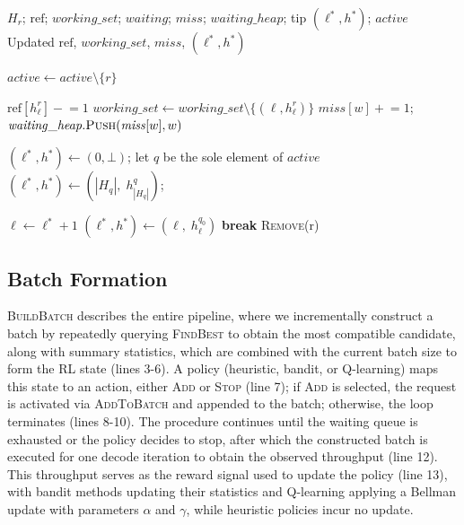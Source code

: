 \begin{algorithm}[t]
\caption{\textsc{Finish}(r)}
\label{alg:finish}
\begin{algorithmic}[1]
\Require $H_r$; $\mathrm{ref}$; $\mathit{working\_set}$; $\mathit{waiting}$; $\mathit{miss}$; $\mathit{waiting\_heap}$; tip $(\ell^*, h^*)$; $\mathit{active}$
\Ensure Updated $\mathrm{ref}$, $\mathit{working\_set}$, $\mathit{miss}$, $(\ell^*, h^*)$

\State $\mathit{active} \gets \mathit{active} \setminus \{r\}$

  \State $\mathrm{ref}[h_\ell^r] \mathrel{-}= 1$
    \State $\mathit{working\_set} \gets \mathit{working\_set} \setminus \{(\ell, h_\ell^r)\}$
      \State $\mathit{miss}[w] \mathrel{+}= 1$;
      \State $\mathit{waiting\_heap}.\textsc{Push}(\mathit{miss}[w], w)$
    \EndFor
  \EndIf
\EndFor

  \State $(\ell^*, h^*) \gets (0, \bot)$;\quad \Return
\EndIf
{}
  \State let $q$ be the sole element of $\mathit{active}$
  \State $(\ell^*, h^*) \gets (|H_q|,\; h_{|H_q|}^q)$;\quad \Return
\EndIf

  \State $\ell \gets \ell^* + 1$
    \State $(\ell^*, h^*) \gets (\ell,\; h_\ell^{q_0})$
  \Else
    \State \textbf{break}
  \EndIf
\EndWhile
\State \textsc{Remove}(r)
\end{algorithmic}
\end{algorithm}

\subsection{Batch Formation}
\textsc{BuildBatch} describes the entire pipeline, where we incrementally construct a batch by repeatedly querying \textsc{FindBest} to obtain the most compatible candidate, along with summary statistics, which are combined with the current batch size to form the RL state (lines 3-6). A policy (heuristic, bandit, or Q-learning) maps this state to an action, either \textsc{Add} or \textsc{Stop} (line 7); if \textsc{Add} is selected, the request is activated via \textsc{AddToBatch} and appended to the batch; otherwise, the loop terminates (lines 8-10). The procedure continues until the waiting queue is exhausted or the policy decides to stop, after which the constructed batch is executed for one decode iteration to obtain the observed throughput (line 12). This throughput serves as the reward signal used to update the policy (line 13), with bandit methods updating their statistics and Q-learning applying a Bellman update with parameters $\alpha$ and $\gamma$, while heuristic policies incur no update.

